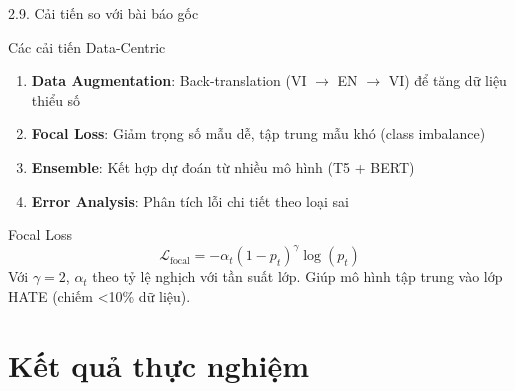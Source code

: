 \documentclass[11pt, aspectratio=169]{beamer}
\begin{document}
\begin{frame}[shrink=5]{2.9. Cải tiến so với bài báo gốc}

\begin{block}{Các cải tiến Data-Centric}
  \begin{enumerate}
    \item \textbf{Data Augmentation}: Back-translation (VI $\rightarrow$ EN $\rightarrow$ VI) để tăng dữ liệu thiểu số
    \item \textbf{Focal Loss}: Giảm trọng số mẫu dễ, tập trung mẫu khó (class imbalance)
    \item \textbf{Ensemble}: Kết hợp dự đoán từ nhiều mô hình (T5 + BERT)
    \item \textbf{Error Analysis}: Phân tích lỗi chi tiết theo loại sai
  \end{enumerate}
\end{block}

\vspace{0.2cm}
\begin{block}{Focal Loss}
  \[
    \mathcal{L}_{\text{focal}} = -\alpha_t (1 - p_t)^\gamma \log(p_t)
  \]
  Với $\gamma = 2$, $\alpha_t$ theo tỷ lệ nghịch với tần suất lớp. Giúp mô hình tập trung vào lớp HATE (chiếm <10\% dữ liệu).
\end{block}
\end{frame}

\section{Kết quả thực nghiệm}
\end{document}
